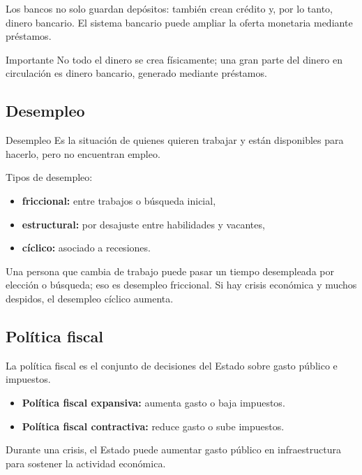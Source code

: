 Los bancos no solo guardan depósitos: también crean crédito y, por lo tanto, dinero bancario. El sistema bancario puede ampliar la oferta monetaria mediante préstamos.

\begin{observacion}{Importante}
No todo el dinero se crea físicamente; una gran parte del dinero en circulación es dinero bancario, generado mediante préstamos.
\end{observacion}

\subsection{Desempleo}

\begin{concepto}{Desempleo}
Es la situación de quienes quieren trabajar y están disponibles para hacerlo, pero no encuentran empleo.
\end{concepto}

Tipos de desempleo:
\begin{itemize}
    \item \textbf{friccional:} entre trabajos o búsqueda inicial,
    \item \textbf{estructural:} por desajuste entre habilidades y vacantes,
    \item \textbf{cíclico:} asociado a recesiones.
\end{itemize}

\begin{ejemplo}
Una persona que cambia de trabajo puede pasar un tiempo desempleada por elección o búsqueda; eso es desempleo friccional. Si hay crisis económica y muchos despidos, el desempleo cíclico aumenta.
\end{ejemplo}

\subsection{Política fiscal}

La política fiscal es el conjunto de decisiones del Estado sobre gasto público e impuestos.

\begin{itemize}
    \item \textbf{Política fiscal expansiva:} aumenta gasto o baja impuestos.
    \item \textbf{Política fiscal contractiva:} reduce gasto o sube impuestos.
\end{itemize}

\begin{ejemplo}
Durante una crisis, el Estado puede aumentar gasto público en infraestructura para sostener la actividad económica.
\end{ejemplo}

